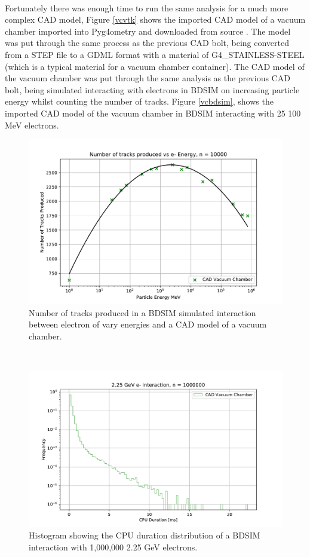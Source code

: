 \documentclass[12pt,a4paper]{article}
\begin{document}
\\
Fortunately there was enough time to run the same analysis for a much more complex CAD model, Figure \ref{vcvtk} shows the imported CAD model of a vacuum chamber imported into Pyg4ometry and downloaded from source \cite{vc}. The model was put through the same process as the previous CAD bolt, being converted from a STEP file to a GDML format with a material of G4\_STAINLESS-STEEL (which is a typical material for a vacuum chamber container). The CAD model of the vacuum chamber was put through the same analysis as the previous CAD bolt, being simulated interacting with electrons in BDSIM on increasing particle energy whilst counting the number of tracks. Figure \ref{vcbdsim}, shows the imported CAD model of the vacuum chamber in BDSIM interacting with 25 100 MeV electrons. 
\\
\begin{figure}[h!]
\centering
\includegraphics[scale=0.5]{Images//VC//countvclogfinal.pdf}
\caption[width=\columnwidth]{Number of tracks produced in a BDSIM simulated interaction between electron of vary energies and a CAD model of a vacuum chamber.}
\label{vccount}
\end{figure}
\\
\begin{figure}[h!]
\centering
\includegraphics[scale=0.5]{Images//VC//vcdist.pdf}
\caption[width=\columnwidth]{Histogram showing the CPU duration distribution of a BDSIM interaction with 1,000,000 2.25 GeV electrons.}
\label{vcdist}
\end{figure}
\end{document}
